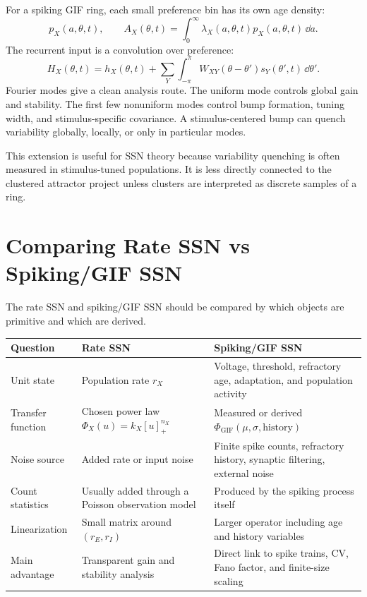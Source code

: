For a spiking GIF ring, each small preference bin has its own age density:
%
\begin{equation}
  p_X(a,\theta,t),
  \qquad
  A_X(\theta,t)
  =
  \int_0^\infty
  \lambda_X(a,\theta,t)p_X(a,\theta,t)\,\dd a.
  \label{eq:gif-ring-density}
\end{equation}
%
The recurrent input is a convolution over preference:
%
\begin{equation}
  H_X(\theta,t)
  =
  h_X(\theta,t)
  +
  \sum_Y
  \int_{-\pi}^{\pi}
  W_{XY}(\theta-\theta')s_Y(\theta',t)\,\dd\theta'.
  \label{eq:gif-ring-input}
\end{equation}
%
Fourier modes give a clean analysis route. The uniform mode controls global gain and stability. The first few nonuniform modes control bump formation, tuning width, and stimulus-specific covariance. A stimulus-centered bump can quench variability globally, locally, or only in particular modes.

This extension is useful for SSN theory because variability quenching is often measured in stimulus-tuned populations. It is less directly connected to the clustered attractor project unless clusters are interpreted as discrete samples of a ring.

\section{Comparing Rate SSN vs Spiking/GIF SSN}
\label{sec:comparing-rate-ssn-vs-spiking-gif-ssn}

The rate SSN and spiking/GIF SSN should be compared by which objects are primitive and which are derived.

\begin{center}
\renewcommand{\arraystretch}{1.4}
\begin{tabularx}{\textwidth}{@{}l X X@{}}
  \toprule
  \textbf{Question} & \textbf{Rate SSN} & \textbf{Spiking/GIF SSN} \\
  \midrule
  Unit state &
  Population rate $r_X$ &
  Voltage, threshold, refractory age, adaptation, and population activity \\
  Transfer function &
  Chosen power law $\Phi_X(u)=k_X[u]_{+}^{n_X}$ &
  Measured or derived $\Phi_{\mathrm{GIF}}(\mu,\sigma,\text{history})$ \\
  Noise source &
  Added rate or input noise &
  Finite spike counts, refractory history, synaptic filtering, external noise \\
  Count statistics &
  Usually added through a Poisson observation model &
  Produced by the spiking process itself \\
  Linearization &
  Small matrix around $(r_E,r_I)$ &
  Larger operator including age and history variables \\
  Main advantage &
  Transparent gain and stability analysis &
  Direct link to spike trains, CV, Fano factor, and finite-size scaling \\
  \bottomrule
\end{tabularx}
\end{center}

